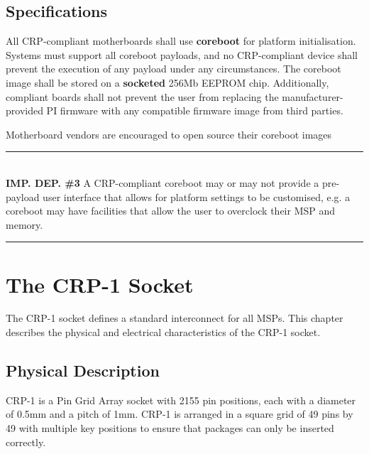 \documentclass[12pt]{report}
\begin{document}

\section{Specifications}
All CRP-compliant motherboards shall use \textbf{coreboot} for platform initialisation. Systems must support all coreboot
payloads, and no CRP-compliant device shall prevent the execution of any payload under any circumstances. The coreboot
image shall be stored on a \textbf{socketed} 256Mb EEPROM chip. Additionally, compliant boards shall not prevent the user from
replacing the manufacturer-provided PI firmware with any compatible firmware image from third parties.

Motherboard vendors are encouraged to open source their coreboot images  

\rule{16cm}{0.4pt}\\
\small
\textbf{IMP. DEP. \#3\:}
A CRP-compliant coreboot may or may not provide a pre-payload user interface that allows for platform settings to be
customised, e.g. a coreboot may have facilities that allow the user to overclock their MSP and memory.\\
\normalsize
\rule{16cm}{0.4pt}

\newpage



\chapter{The CRP-1 Socket}
\large
The CRP-1 socket defines a standard interconnect for all MSPs. This chapter describes the physical and electrical
characteristics of the CRP-1 socket.
\normalsize
\newpage
\section{Physical Description}
CRP-1 is a Pin Grid Array socket with 2155 pin positions, each with a diameter of 0.5mm and a pitch of 1mm. CRP-1 is arranged
in a square grid of 49 pins by 49 with multiple key positions to ensure that packages can only be inserted correctly. 
\end{document}
